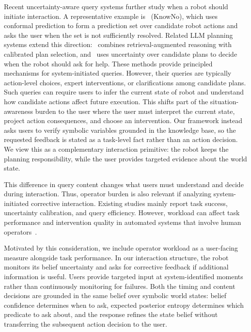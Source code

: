 Recent uncertainty-aware query systems further study when a robot should initiate interaction. A representative example is~\cite{ren2023robots} (KnowNo), which uses conformal prediction to form a prediction set over candidate robot actions and asks the user when the set is not sufficiently resolved. Related LLM planning systems extend this direction:~\cite{liang2024introspective} combines retrieval-augmented reasoning with calibrated plan selection, and~\cite{mullen2025lbap} uses uncertainty over candidate plans to decide when the robot should ask for help. These methods provide principled mechanisms for system-initiated queries. However, their queries are typically action-level choices, expert interventions, or clarifications among candidate plans. Such queries can require users to infer the current state of robot and understand how candidate actions affect future execution. This shifts part of the situation-awareness burden to the user where the user must interpret the current state, project action consequences, and choose an intervention. Our framework instead asks users to verify symbolic variables grounded in the knowledge base, so the requested feedback is stated as a task-level fact rather than an action decision. We view this as a complementary interaction primitive: the robot keeps the planning responsibility, while the user provides targeted evidence about the world state.


This difference in query content changes what users must understand and decide during interaction. Thus, operator burden is also relevant if analyzing system-initiated corrective interaction. Existing studies mainly report task success, uncertainty calibration, and query efficiency. However, workload can affect task performance and intervention quality in automated systems that involve human operators~\cite{murata2000ergonomics,borragan2017cognitive,rajavenkatanarayanan2019towards}.


Motivated by this consideration, we include operator workload as a user-facing measure alongside task performance. In our interaction structure, the robot monitors its belief uncertainty and asks for corrective feedback if additional information is useful. Users provide targeted input at system-identified moments rather than continuously monitoring for failures. Both the timing and content decisions are grounded in the same belief over symbolic world states: belief confidence determines when to ask, expected posterior entropy determines which predicate to ask about, and the response refines the state belief without transferring the subsequent action decision to the user.
